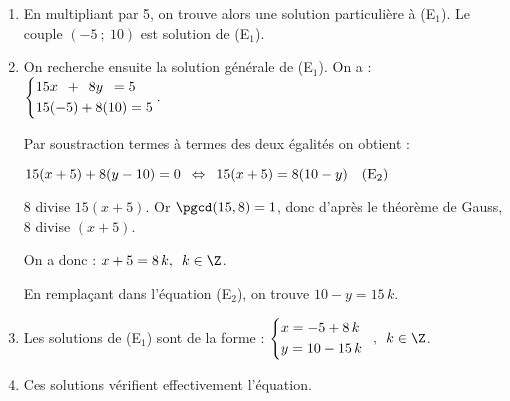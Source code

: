 \begin{methode*1}[Résoudre une équation du type \textit{ax} + \textit{by} = \textit{c}\MethodeRefExercice*{exo-eq_diophantienne}]
\begin{enumerate}
$(-1~;~2)$ est solution évidente à (E$_2$) car : \enskip $15\times(-1)+8\times2=-15+16=1$.
\item En multipliant par 5, on trouve alors une solution particulière à (E$_1$). Le couple $(-5~;~10)$ est solution de (E$_1$).
\item On recherche ensuite la solution générale de (E$_1$).
On a : \enskip $\left\{\begin{aligned}
&15x\enskip +\enskip 8y\enskip=5\\
&15(-5)+8(10)=5\end{aligned}\right..$

Par soustraction termes à termes des deux égalités on obtient :
{\centering $15(x+5)+8(y-10)=0\enskip\Leftrightarrow\enskip 15(x+5)=8(10-y)\quad (\text{E}_2)$\par}

8 divise $15(x+5)$. Or $\pgcd(15,8)=1$, donc d'après le théorème de
Gauss, 8 divise $(x+5)$. 

On a donc : \enskip $x+5=8\,k,\enskip k\in\Z$. 

En remplaçant dans l'équation (E$_2$), on trouve \enskip
$10-y=15\,k$.\medskip

\item Les  solutions de (E$_1$) sont de la forme : \enskip $\left\{\begin{aligned}
&x=-5+8\,k\\
&y=10-15\,k\end{aligned}\right.\enskip, \enskip k\in\Z$.\medskip

\item Ces solutions vérifient effectivement l’équation.
\end{enumerate}
\vspace{-\baselineskip}
\end{methode*1}

